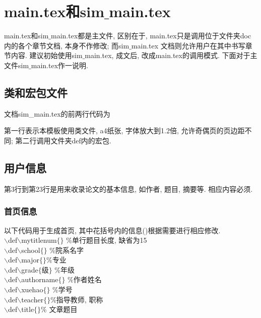 \documentclass[a4paper,12pt,twoside]{ctexart}
\begin{document}
\section{main.tex和sim$\_$main.tex}

    main.tex和sim$\_$main.tex都是主文件, 区别在于, main.tex只是调用位于文件夹doc内的各个章节文档, 本身不作修改; 而sim$\_$main.tex 文档则允许用户在其中书写章节内容. 建议初始使用sim$\_$main.tex, 成文后, 改成main.tex的调用模式. 下面对于主文件sim$\_$main.tex作一说明. %

    \subsection{类和宏包文件}
    文档sim\_main.tex的前两行代码为
    第一行表示本模板使用类文件, a4纸张, 字体放大到1.2倍, 允许奇偶页的页边距不同; 第二行调用文件夹def内的宏包.

    \subsection{用户信息}
    第3行到第23行是用来收录论文的基本信息, 如作者, 题目, 摘要等. 相应内容必须.
    \subsubsection{首页信息}
    以下代码用于生成首页, 其中花括号内的信息()根据需要进行相应修改.\\
    \indent$\backslash$def$\backslash$mytitlenum$\{$$\}$
    \qquad\quad\%单行题目长度, 缺省为15\\
    \indent$\backslash$def$\backslash$school$\{$$\}$ \qquad\quad \%院系名字\\
    \indent$\backslash$def$\backslash$major$\{$$\}$\qquad\quad \%专业\\
    \indent $\backslash$def$\backslash$grade$\{$级$\}$ \qquad\quad \%年级\\
    \indent $\backslash$def$\backslash$authorname$\{$$\}$ \qquad\quad \%作者姓名\\
    \indent$\backslash$def$\backslash$xuehao$\{$$\}$ \quad\qquad \%学号\\
    \indent$\backslash$def$\backslash$teacher$\{$$\}$\qquad\quad \%指导教师, 职称\\
    \indent$\backslash$def$\backslash$title$\{$$\}$\qquad\quad \% 文章题目
\end{document}
